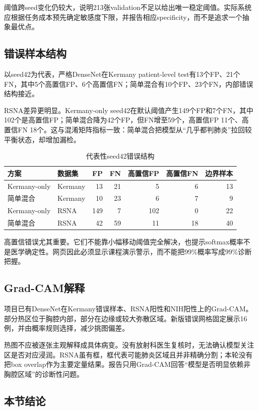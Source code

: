 阈值跨seed变化仍较大，说明213张validation不足以给出唯一稳定阈值。实际系统应根据任务成本预先确定敏感度下限，并报告相应specificity，而不是追求一个抽象最优点。

\subsection{错误样本结构}

以seed42为代表，严格DenseNet在Kermany patient-level test有13个FP、21个FN，其中5个高置信FP、6个高置信FN；简单混合有10个FP、23个FN，内部错误结构接近。

RSNA差异更明显。Kermany-only seed42在默认阈值产生149个FP和7个FN，其中102个是高置信FP；简单混合降为42个FP，但FN增至59个，高置信FP 11个、高置信FN 18个。这与混淆矩阵指标一致：简单混合把模型从“几乎都判肺炎”拉回较平衡状态，却增加漏检。

\begin{table}[H]
\centering
\caption{代表性seed42错误结构}
\begin{tabular}{llrrrrr}
\toprule 方案 & 数据集 & FP & FN & 高置信FP & 高置信FN & 边界样本\\\midrule
Kermany-only & Kermany & 13 & 21 & 5 & 6 & 13\\
简单混合 & Kermany & 10 & 23 & 6 & 7 & 9\\
Kermany-only & RSNA & 149 & 7 & 102 & 0 & 22\\
简单混合 & RSNA & 42 & 59 & 11 & 18 & 40\\\bottomrule
\end{tabular}
\end{table}

高置信错误尤其重要。它们不能靠小幅移动阈值完全解决，也提示softmax概率不是医学确定性。网页因此必须显示课程演示警示，而不能把99\%概率写成99\%诊断把握。

\subsection{Grad-CAM解释}

项目已有DenseNet在Kermany错误样本、RSNA阳性和NIH阳性上的Grad-CAM。部分热区位于胸腔内部，部分在边缘或较大弥散区域。新版错误网格固定展示16例，并由概率规则选择，减少挑图偏差。

热图不应被逐张主观解释成具体病变。没有放射科医生复核时，无法确认模型关注区是否对应浸润。RSNA虽有框，框代表可能肺炎区域且并非精确分割；本轮没有把box overlap作为主要定量结果。报告只用Grad-CAM回答“模型是否明显依赖非胸腔区域”的诊断性问题。

\subsection{本节结论}

